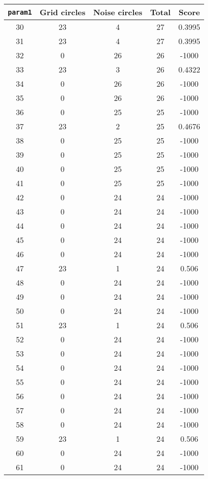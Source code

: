 \documentclass[letterpaper, 12pt]{article}
\begin{document}
\begin{longtable}{|c|c|c|c|c|}
\hline
\textbf{\texttt{param1}} & \textbf{Grid circles} & \textbf{Noise circles} & \textbf{Total} & \textbf{Score} \\
\hline
30 & 23 & 4 & 27 & 0.3995 \\
\hline
31 & 23 & 4 & 27 & 0.3995 \\
\hline
32 & 0 & 26 & 26 & -1000 \\
\hline
33 & 23 & 3 & 26 & 0.4322 \\
\hline
34 & 0 & 26 & 26 & -1000 \\
\hline
35 & 0 & 26 & 26 & -1000 \\
\hline
36 & 0 & 25 & 25 & -1000 \\
\hline
37 & 23 & 2 & 25 & 0.4676 \\
\hline
38 & 0 & 25 & 25 & -1000 \\
\hline
39 & 0 & 25 & 25 & -1000 \\
\hline
40 & 0 & 25 & 25 & -1000 \\
\hline
41 & 0 & 25 & 25 & -1000 \\
\hline
42 & 0 & 24 & 24 & -1000 \\
\hline
43 & 0 & 24 & 24 & -1000 \\
\hline
44 & 0 & 24 & 24 & -1000 \\
\hline
45 & 0 & 24 & 24 & -1000 \\
\hline
46 & 0 & 24 & 24 & -1000 \\
\hline
47 & 23 & 1 & 24 & 0.506 \\
\hline
48 & 0 & 24 & 24 & -1000 \\
\hline
49 & 0 & 24 & 24 & -1000 \\
\hline
50 & 0 & 24 & 24 & -1000 \\
\hline
51 & 23 & 1 & 24 & 0.506 \\
\hline
52 & 0 & 24 & 24 & -1000 \\
\hline
53 & 0 & 24 & 24 & -1000 \\
\hline
54 & 0 & 24 & 24 & -1000 \\
\hline
55 & 0 & 24 & 24 & -1000 \\
\hline
56 & 0 & 24 & 24 & -1000 \\
\hline
57 & 0 & 24 & 24 & -1000 \\
\hline
58 & 0 & 24 & 24 & -1000 \\
\hline
59 & 23 & 1 & 24 & 0.506 \\
\hline
60 & 0 & 24 & 24 & -1000 \\
\hline
61 & 0 & 24 & 24 & -1000 \\

\end{longtable}
\end{document}
